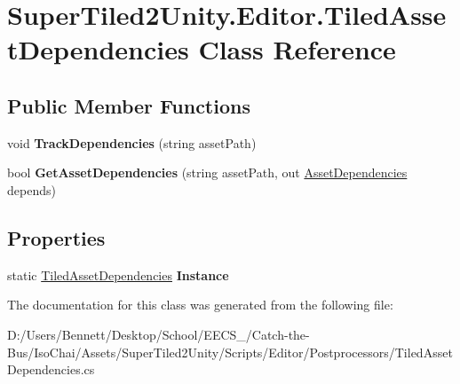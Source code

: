 \hypertarget{class_super_tiled2_unity_1_1_editor_1_1_tiled_asset_dependencies}{}\section{Super\+Tiled2\+Unity.\+Editor.\+Tiled\+Asset\+Dependencies Class Reference}
\label{class_super_tiled2_unity_1_1_editor_1_1_tiled_asset_dependencies}
\subsection*{Public Member Functions}
\begin{DoxyCompactItemize}
\item 
\mbox{\label{class_super_tiled2_unity_1_1_editor_1_1_tiled_asset_dependencies_a061469bf7d809fe3ae3c6b0b07bd1f11}} 
void {\bfseries Track\+Dependencies} (string asset\+Path)
\item 
\mbox{\label{class_super_tiled2_unity_1_1_editor_1_1_tiled_asset_dependencies_a4df6fe09587305e4808433ed4a39cdc6}} 
bool {\bfseries Get\+Asset\+Dependencies} (string asset\+Path, out \mbox{\hyperlink{class_super_tiled2_unity_1_1_editor_1_1_asset_dependencies}{Asset\+Dependencies}} depends)
\end{DoxyCompactItemize}
\subsection*{Properties}
\begin{DoxyCompactItemize}
\item 
\mbox{\label{class_super_tiled2_unity_1_1_editor_1_1_tiled_asset_dependencies_a29d8179d51b034eb19a3b5703272f9e3}} 
static \mbox{\hyperlink{class_super_tiled2_unity_1_1_editor_1_1_tiled_asset_dependencies}{Tiled\+Asset\+Dependencies}} {\bfseries Instance}
\end{DoxyCompactItemize}


The documentation for this class was generated from the following file\+:\begin{DoxyCompactItemize}
\item 
D\+:/\+Users/\+Bennett/\+Desktop/\+School/\+E\+E\+C\+S\+\_/\+Catch-\/the-\/\+Bus/\+Iso\+Chai/\+Assets/\+Super\+Tiled2\+Unity/\+Scripts/\+Editor/\+Postprocessors/Tiled\+Asset\+Dependencies.\+cs\end{DoxyCompactItemize}
